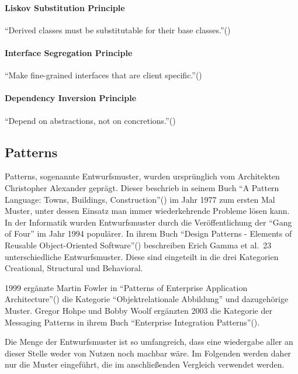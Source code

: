 \paragraph{Liskov Substitution Principle}
\enquote{Derived classes must be substitutable for their base classes.}(\cite{solid})

\paragraph{Interface Segregation Principle}
\enquote{Make fine-grained interfaces that are client specific.}(\cite{solid})

\paragraph{Dependency Inversion Principle}
\enquote{Depend on abstractions, not on concretions.}(\cite{solid})

\subsection{Patterns}
Patterns, sogenannte Entwurfsmuster, wurden ursprünglich vom Architekten Christopher Alexander geprägt.
Dieser beschrieb in seinem Buch \enquote{A Pattern Language: Towns, Buildings, Construction}(\cite{a-pattern-language}) im Jahr 1977 zum ersten Mal Muster, unter dessen Einsatz man immer wiederkehrende Probleme lösen kann.
In der Informatik wurden Entwurfsmuster durch die Veröffentlichung der \enquote{Gang of Four} im Jahr 1994 populärer.
In ihrem Buch \enquote{Design Patterns - Elements of Reusable Object-Oriented Software}(\cite{gamma-design-patterns}) beschreiben Erich Gamma et al.\ 23 unterschiedliche Entwurfsmuster.
Diese sind eingeteilt in die drei Kategorien Creational, Structural und Behavioral.

1999 ergänzte Martin Fowler in \enquote{Patterns of Enterprise Application Architecture}(\cite{patterns-of-enterprise-application-architecture}) die Kategorie \enquote{Objektrelationale Abbildung} und dazugehörige Muster.
Gregor Hohpe und Bobby Woolf ergänzten 2003 die Kategorie der Messaging Patterns in ihrem Buch \enquote{Enterprise Integration Patterns}(\cite{enterprise-integration-patterns}).

Die Menge der Entwurfsmuster ist so umfangreich, dass eine wiedergabe aller an dieser Stelle weder von Nutzen noch machbar wäre.
Im Folgenden werden daher nur die Muster eingeführt, die im anschließenden Vergleich verwendet werden.
